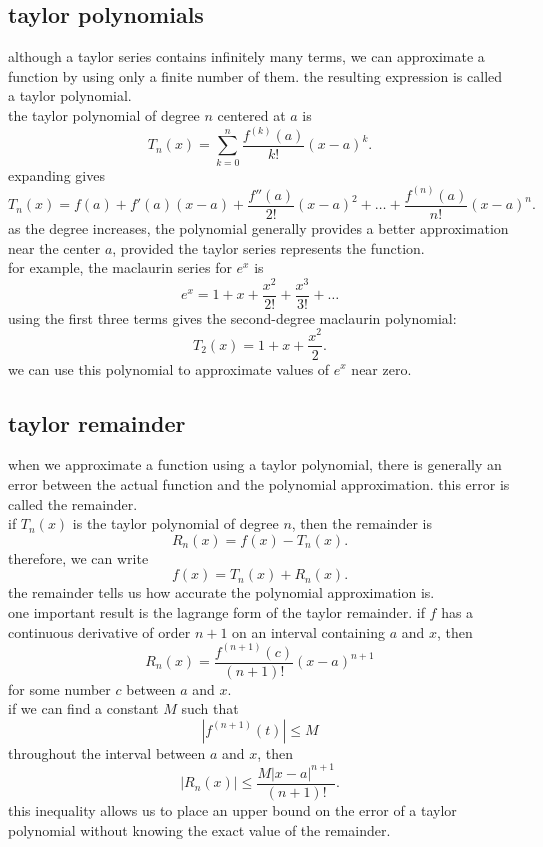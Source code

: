 \documentclass{article}
\begin{document}
\subsection{taylor polynomials}

although a taylor series contains infinitely many terms, we can approximate a function by using only a finite number of them. the resulting expression is called a taylor polynomial.\\

the taylor polynomial of degree $n$ centered at $a$ is
\[
\boxed{
T_n(x)=
\sum_{k=0}^{n}
\frac{f^{(k)}(a)}{k!}(x-a)^k.
}
\]
expanding gives
\[
T_n(x)=f(a)+f'(a)(x-a)
+\frac{f''(a)}{2!}(x-a)^2
+\ldots+
\frac{f^{(n)}(a)}{n!}(x-a)^n.
\]
as the degree increases, the polynomial generally provides a better approximation near the center $a$, provided the taylor series represents the function.\\

for example, the maclaurin series for $e^x$ is
\[
e^x=1+x+\frac{x^2}{2!}+\frac{x^3}{3!}+\ldots
\]
using the first three terms gives the second-degree maclaurin polynomial:
\[
T_2(x)=1+x+\frac{x^2}{2}.
\]
we can use this polynomial to approximate values of $e^x$ near zero.\\

\subsection{taylor remainder}

when we approximate a function using a taylor polynomial, there is generally an error between the actual function and the polynomial approximation. this error is called the remainder.\\

if $T_n(x)$ is the taylor polynomial of degree $n$, then the remainder is
\[
\boxed{
R_n(x)=f(x)-T_n(x).
}
\]
therefore, we can write
\[
f(x)=T_n(x)+R_n(x).
\]
the remainder tells us how accurate the polynomial approximation is.\\

one important result is the lagrange form of the taylor remainder. if $f$ has a continuous derivative of order $n+1$ on an interval containing $a$ and $x$, then
\[
\boxed{
R_n(x)=
\frac{f^{(n+1)}(c)}{(n+1)!}(x-a)^{n+1}
}
\]
for some number $c$ between $a$ and $x$.\\

if we can find a constant $M$ such that
\[
|f^{(n+1)}(t)|\leq M
\]
throughout the interval between $a$ and $x$, then
\[
\boxed{
|R_n(x)|
\leq
\frac{M|x-a|^{n+1}}{(n+1)!}.
}
\]
this inequality allows us to place an upper bound on the error of a taylor polynomial without knowing the exact value of the remainder.\\
\end{document}
